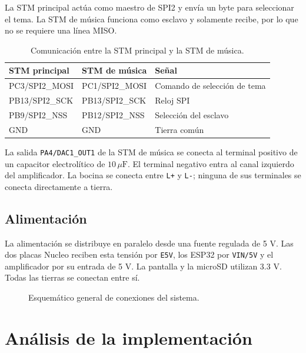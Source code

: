 \documentclass[11pt,letterpaper]{article}
\begin{document}
La STM principal actúa como maestro de SPI2 y envía un byte para seleccionar el
tema. La STM de música funciona como esclavo y solamente recibe, por lo que no se
requiere una línea MISO.

\begin{table}[htbp]
\centering
\small
\caption{Comunicación entre la STM principal y la STM de música.}
\begin{tabularx}{\textwidth}{@{}l l Y@{}}
\toprule
\textbf{STM principal} & \textbf{STM de música} & \textbf{Señal} \\
\midrule
PC3/SPI2\_MOSI & PC1/SPI2\_MOSI & Comando de selección de tema \\
PB13/SPI2\_SCK & PB13/SPI2\_SCK & Reloj SPI \\
PB9/SPI2\_NSS & PB12/SPI2\_NSS & Selección del esclavo \\
GND & GND & Tierra común \\
\bottomrule
\end{tabularx}
\end{table}

La salida \texttt{PA4/DAC1\_OUT1} de la STM de música se conecta al terminal
positivo de un capacitor electrolítico de $10\,\mu\text{F}$. El terminal negativo
entra al canal izquierdo del amplificador. La bocina se conecta entre
\texttt{L+} y \texttt{L-}; ninguna de sus terminales se conecta directamente a
tierra.

\subsection{Alimentación}

La alimentación se distribuye en paralelo desde una fuente regulada de 5 V. Las
dos placas Nucleo reciben esta tensión por \texttt{E5V}, los ESP32 por
\texttt{VIN/5V} y el amplificador por su entrada de 5 V. La pantalla y la microSD
utilizan 3.3 V. Todas las tierras se conectan entre sí.

\begin{figure}[htbp]
\centering
\caption{Esquemático general de conexiones del sistema.}
\label{fig:esquematico-general}
\end{figure}

\section{Análisis de la implementación}
\end{document}
